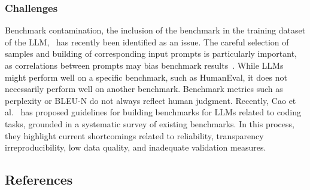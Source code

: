 \subsubsection{Challenges}

Benchmark contamination, the inclusion of the benchmark in the training dataset of the LLM,~\cite{DBLP:journals/corr/abs-2410-16186} has recently been identified as an issue.
The careful selection of samples and building of corresponding input prompts is particularly important, as correlations between prompts may bias benchmark results~\cite{DBLP:conf/acl/SiskaMAB24}.
While LLMs might perform well on a specific benchmark, such as HumanEval, it does not necessarily perform well on another benchmark.
Benchmark metrics such as perplexity or BLEU-N do not always reflect human judgment.
Recently, Cao et al.~\cite{cao2025should} has proposed guidelines for building benchmarks for LLMs related to coding tasks, grounded in a systematic survey of existing benchmarks. 
In this process, they highlight current shortcomings related to reliability, transparency irreproducibility, low data quality, and inadequate validation measures.

\subsection{References}





